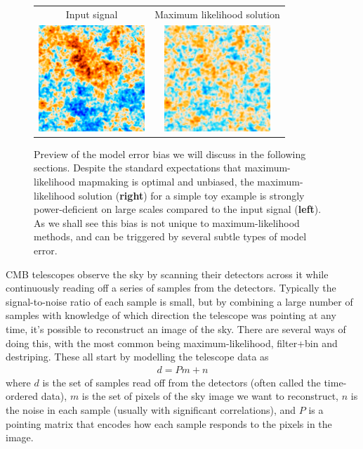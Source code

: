 \documentclass{aa}
\newcommand{\dfn}[1]{\textbf{#1}}
\newenvironment{closetabcols}[1][0.5mm]{\setlength{\tabcolsep}{#1}}{}
\begin{document}
\begin{figure}
	\centering
	\begin{closetabcols}
	\begin{tabular}{cc}
		Input signal & Maximum likelihood solution \\
		\includegraphics[width=40mm]{subpix/toy2d_input_signal_map.png} &
		\includegraphics[width=40mm]{subpix/toy2d_ml_nn_signal_map.png} \\
	\end{tabular}
	\end{closetabcols}
	\caption{Preview of the model error bias we will discuss in the following
	sections. Despite the standard expectations that maximum-likelihood mapmaking
	is optimal and unbiased, the maximum-likelihood solution (\dfn{right})
	for a simple toy example is strongly power-deficient on large scales
	compared to the input signal (\dfn{left}). As we shall see this bias
	is not unique to maximum-likelihood methods, and can be triggered by
	several subtle types of model error.}
	\label{fig:maps-2d}
\end{figure}

CMB telescopes observe the sky by scanning their detectors across
it while continuously reading off a series of samples from the
detectors. Typically the signal-to-noise ratio of each sample is
small, but by combining a large number of samples with knowledge
of which direction the telescope was pointing at any time, it's
possible to reconstruct an image of the sky. There are several
ways of doing this, with the most common being maximum-likelihood,
filter+bin and destriping. These all start by modelling the
telescope data as \citep{tegmark-mapmaking}
\begin{align}
	d = Pm + n \label{eq:model}
\end{align}
where $d$ is the set of samples read off from the detectors
(often called the time-ordered data), $m$ is the set of pixels
of the sky image we want to reconstruct, $n$ is the noise
in each sample (usually with significant correlations), and
$P$ is a pointing matrix that encodes how each sample responds
to the pixels in the image.
\end{document}
